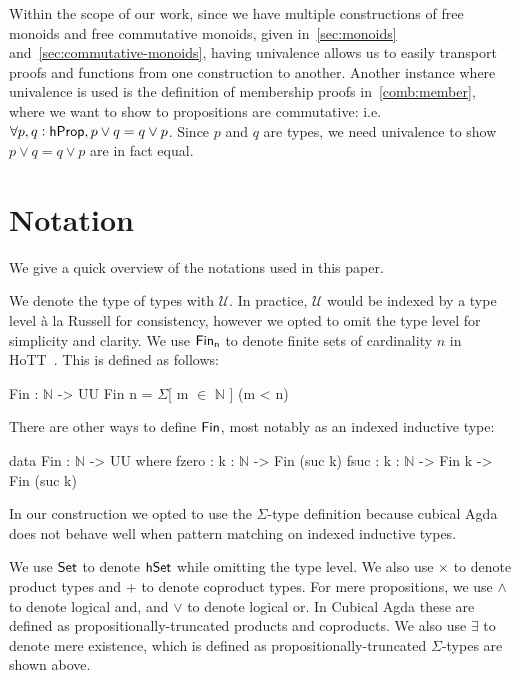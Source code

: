 Within the scope of our work, since we have multiple constructions of free monoids
and free commutative monoids, given in~\cref{sec:monoids} and~\cref{sec:commutative-monoids},
having univalence allows us to easily transport proofs and functions from one construction to another.
Another instance where univalence is used is the definition of membership proofs in~\cref{comb:member},
where we want to show to propositions are commutative: i.e. $\forall p, q: \mathsf{hProp}, p \vee q = q \vee p$.
Since $p$ and $q$ are types, we need univalence to show $p \vee q = q \vee p$ are in fact equal.

\section{Notation}\label{sec:notation}
We give a quick overview of the notations used in this paper.

We denote the type of types with $\mathcal{U}$. 
In practice, $\mathcal{U}$ would be indexed by a type level 
à la Russell for consistency, however we opted to omit the type level
for simplicity and clarity.
We use $\Fin[n]$ to denote finite sets of cardinality $n$ in HoTT~\cite{yorgeyCombinatorialSpeciesLabelled2014a}.
This is defined as follows:

\begin{code}
Fin : $\mathbb{N}$ -> UU
Fin n = $\Sigma$[ m $\in$ $\mathbb{N}$ ] (m < n)
\end{code}

There are other ways to define $\Fin$, most notably as an indexed inductive type:
\begin{code}
data Fin : $\mathbb{N}$ -> UU where
    fzero : {k : $\mathbb{N}$} -> Fin (suc k)
    fsuc : {k : $\mathbb{N}$} -> Fin k -> Fin (suc k)
\end{code}


In our construction we opted to use the $\Sigma$-type definition
because cubical Agda does not behave well
when pattern matching on indexed inductive types.

We use $\operatorname{\mathsf{Set}}$ to denote $\mathsf{hSet}$ while omitting the type level.
We also use $\times$ to denote product types and $+$ to denote coproduct types.
For mere propositions, we use $\land$ to denote logical and, and $\vee$ to denote logical or.
In Cubical Agda these are defined as propositionally-truncated products and coproducts.
We also use $\exists$ to denote mere existence, which is defined as
propositionally-truncated $\Sigma$-types are shown above.